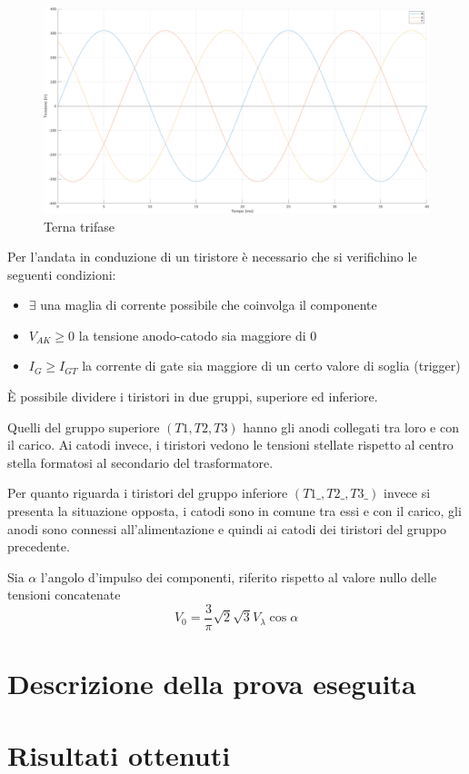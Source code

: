\documentclass[a4paper,10pt]{article}
\begin{document}
 \begin{figure}[H]
 \centering
 \includegraphics[keepaspectratio=true,width=0.95\linewidth]
 {img/sinusoidi_trifase.png}
 \caption{Terna trifase}
 \label{fig:terna_trifase}
\end{figure}

Per l'andata in conduzione di un tiristore è necessario che si verifichino le seguenti
condizioni:
\begin{itemize}
 \item \(\exists\) una maglia di corrente possibile che coinvolga il componente
 \item \(V_{AK} \geq 0\) la tensione anodo-catodo sia maggiore di 0
 \item \(I_G \geq I_{GT}\) la corrente di gate sia maggiore di 
 un certo valore di soglia (trigger)
\end{itemize}

È possibile dividere i tiristori in due gruppi, superiore ed inferiore. 

Quelli del gruppo superiore \((T1,T2,T3)\) hanno gli anodi collegati tra loro
e con il carico. Ai catodi invece, i tiristori vedono le 
tensioni stellate rispetto al centro stella formatosi al secondario
del trasformatore.

Per quanto riguarda i tiristori del gruppo inferiore \((T1\_,T2\_,T3\_)\) invece
si presenta la situazione opposta, i catodi sono in comune tra essi e con il carico,
gli anodi sono connessi all'alimentazione e quindi ai catodi dei tiristori del gruppo precedente.



Sia \(\alpha\) l'angolo d'impulso dei componenti, riferito rispetto al valore nullo
delle tensioni concatenate
\begin{equation}
 V_0 = \frac{3}{\pi} \sqrt{2} \sqrt{3} V_\lambda \cos\alpha
 \label{eq:valore_medio_tensione_ponte}
\end{equation}


\section{Descrizione della prova eseguita}

\section{Risultati ottenuti}
\end{document}
